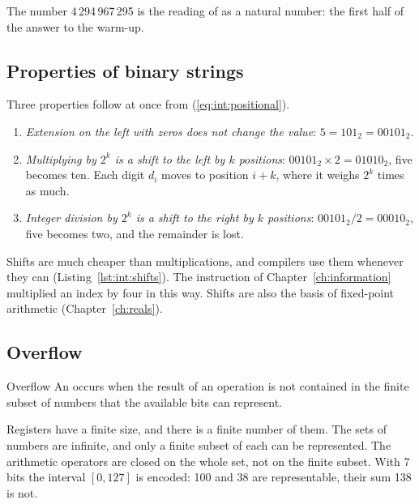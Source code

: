 The number 4\,294\,967\,295 is the reading of  as a natural
number: the first half of the answer to the warm-up.

\subsection{Properties of binary strings}

Three properties follow at once from (\ref{eq:int:positional}).

\begin{enumerate}
\item \emph{Extension on the left with zeros does not change the value}:
  $5 = 101_2 = 00101_2$.
\item \emph{Multiplying by $2^{k}$ is a shift to the left by $k$ positions}:
  $00101_2\times 2 = 01010_2$, five becomes ten. Each digit $d_i$ moves to
  position $i+k$, where it weighs $2^{k}$ times as much.
\item \emph{Integer division by $2^{k}$ is a shift to the right by $k$
  positions}: $00101_2/2 = 00010_2$, five becomes two, and the remainder is
  lost.
\end{enumerate}

Shifts are much cheaper than multiplications, and compilers use them whenever
they can (Listing~\ref{lst:int:shifts}). The instruction
 of Chapter~\ref{ch:information} multiplied an index by
four in this way. Shifts are also the basis of fixed-point arithmetic
(Chapter~\ref{ch:reals}).


\subsection{Overflow}

\begin{definition}{Overflow}
An  occurs when the result of an operation is not contained in
the finite subset of numbers that the available bits can represent.
\end{definition}

Registers have a finite size, and there is a finite number of them. The sets
of numbers are infinite, and only a finite subset of each can be represented.
The arithmetic operators are closed on the whole set, not on the finite
subset. With 7 bits the interval $[0,127]$ is encoded: 100 and 38 are
representable, their sum 138 is not.


